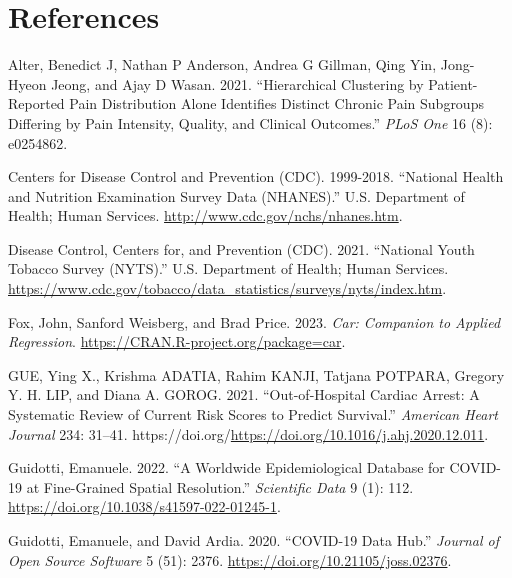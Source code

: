 \documentclass[
  letterpaper,
]{krantz}
\newlength{\cslhangindent}
\newenvironment{CSLReferences}[2] %
 {\begin{list}{}{%
  \setlength{\itemindent}{0pt}
  \setlength{\leftmargin}{0pt}
  \setlength{\parsep}{0pt}
  \ifodd #1
   \setlength{\leftmargin}{\cslhangindent}
   \setlength{\itemindent}{-1\cslhangindent}
  \fi
  \setlength{\itemsep}{#2\baselineskip}}}
 {\end{list}}
\begin{document}
\chapter*{References}\label{references}


\label{refs}
\begin{CSLReferences}{1}{0}
Alter, Benedict J, Nathan P Anderson, Andrea G Gillman, Qing Yin,
Jong-Hyeon Jeong, and Ajay D Wasan. 2021. {``Hierarchical Clustering by
Patient-Reported Pain Distribution Alone Identifies Distinct Chronic
Pain Subgroups Differing by Pain Intensity, Quality, and Clinical
Outcomes.''} \emph{PLoS One} 16 (8): e0254862.

Centers for Disease Control and Prevention (CDC). 1999-2018.
{``{National Health and Nutrition Examination Survey Data (NHANES)}.''}
U.S. Department of Health; Human Services.
\url{http://www.cdc.gov/nchs/nhanes.htm}.

Disease Control, Centers for, and Prevention (CDC). 2021. {``{National
Youth Tobacco Survey (NYTS)}.''} U.S. Department of Health; Human
Services.
\url{https://www.cdc.gov/tobacco/data_statistics/surveys/nyts/index.htm}.

Fox, John, Sanford Weisberg, and Brad Price. 2023. \emph{Car: Companion
to Applied Regression}. \url{https://CRAN.R-project.org/package=car}.

GUE, Ying X., Krishma ADATIA, Rahim KANJI, Tatjana POTPARA, Gregory Y.
H. LIP, and Diana A. GOROG. 2021. {``Out-of-Hospital Cardiac Arrest: A
Systematic Review of Current Risk Scores to Predict Survival.''}
\emph{American Heart Journal} 234: 31--41.
https://doi.org/\url{https://doi.org/10.1016/j.ahj.2020.12.011}.

Guidotti, Emanuele. 2022. {``A Worldwide Epidemiological Database for
COVID-19 at Fine-Grained Spatial Resolution.''} \emph{Scientific Data} 9
(1): 112. \url{https://doi.org/10.1038/s41597-022-01245-1}.

Guidotti, Emanuele, and David Ardia. 2020. {``COVID-19 Data Hub.''}
\emph{Journal of Open Source Software} 5 (51): 2376.
\url{https://doi.org/10.21105/joss.02376}.


\end{CSLReferences}
\end{document}
